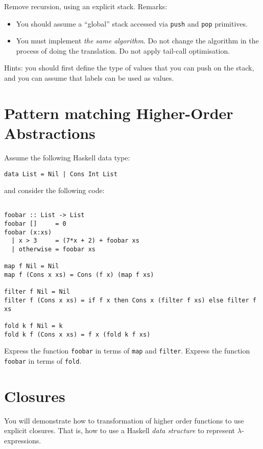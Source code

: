 \documentclass{article}
\begin{document}
Remove recursion, using an explicit stack. Remarks:

\begin{itemize}
\item  You should assume a ``global'' stack accessed via \texttt{push}
  and \texttt{pop} primitives.

\item You must implement \emph{the same algorithm}. Do not change the
  algorithm in the process of doing the translation. Do not apply
  tail-call optimisation.
\end{itemize}

Hints: you should first define the type of values that you can push on
the stack, and you can assume that labels can be used as values.


\newpage
\section{Pattern matching Higher-Order Abstractions}

Assume the following Haskell data type:
\begin{verbatim}
data List = Nil | Cons Int List
\end{verbatim}
and consider the following code:
\begin{verbatim}

foobar :: List -> List
foobar []     = 0
foobar (x:xs)
  | x > 3     = (7*x + 2) + foobar xs
  | otherwise = foobar xs

map f Nil = Nil
map f (Cons x xs) = Cons (f x) (map f xs)

filter f Nil = Nil
filter f (Cons x xs) = if f x then Cons x (filter f xs) else filter f xs

fold k f Nil = k
fold k f (Cons x xs) = f x (fold k f xs)
\end{verbatim}

Express the function \texttt{foobar} in terms of \texttt{map} and \texttt{filter}.
Express the function \texttt{foobar} in terms of \texttt{fold}.

\newpage
\section{Closures}

You will demonstrate how to transformation of higher order functions
to use explicit closures.  That is, how to use a Haskell \emph{data
  structure} to represent $\lambda$-expressions.
\end{document}
